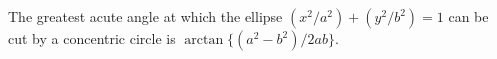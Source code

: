 The greatest acute angle at which the ellipse $(x^{2}/a^{2}) + (y^{2}/b^{2}) = 1$ can
be cut by a concentric circle is $\arctan\{(a^{2} - b^{2})/2ab\}$. 


